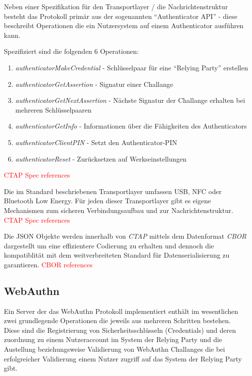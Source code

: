 \documentclass[journal]{IEEEtran}
\begin{document}
Neben einer Spezifikation für den Transportlayer / die Nachrichtenstruktur
besteht das Protokoll primär aus der sogenannten ``Authenticator API'' - diese
beschreibt Operationen die ein Nutzersystem auf einem Authenticator ausführen kann.

Spezifiziert sind die folgenden 6 Operationen:

\begin{enumerate}
	\item \textit{authenticatorMakeCredential} - Schlüsselpaar für eine
		``Relying Party'' erstellen
	\item \textit{authenticatorGetAssertion} - Signatur einer Challange
	\item \textit{authenticatorGetNextAssertion} - Nächste Signatur der
		Challange erhalten bei mehreren Schlüsselpaaren
	\item \textit{authenticatorGetInfo} - Informationen über die Fähigkeiten
		des Authenticators
	\item \textit{authenticatorClientPIN} - Setzt den Authenticator-PIN
	\item \textit{authenticatorReset} - Zurücksetzen auf Werkseinstellungen
\end{enumerate}

\textcolor{red}{CTAP Spec references}

Die im Standard beschriebenen Transportlayer umfassen USB, NFC oder Bluetooth
Low Energy. Für jeden dieser Transportlayer gibt es eigene Mechanismen zum
sicheren Verbindungsaufbau und zur Nachrichtenstruktur.
\textcolor{red}{CTAP Spec references}

Die JSON Objekte werden innerhalb von \textit{CTAP} mittels dem Datenformat
\textit{CBOR} dargestellt um eine effizientere Codierung zu erhalten und
dennoch die kompatiblität mit dem weitverbreiteten Standard für
Datenserialisierung zu garantieren.
\textcolor{red}{CBOR references}

\subsection{WebAuthn}

Ein Server der das WebAuthn Protokoll implementiert enthält im wesentlichen
zwei grundlegende Operationen die jeweils aus mehreren Schritten bestehen.
Diese sind die Registrierung von Sicherheitsschlüsseln (Credentials) und deren
zuordnung zu einem Nutzeraccount im System der Relying Party und die
Austellung beziehungsweise Validierung von WebAuthn Challanges die bei
erfolgreicher Validierung einem Nutzer zugriff auf das System der Relying Party
gibt.
\end{document}
